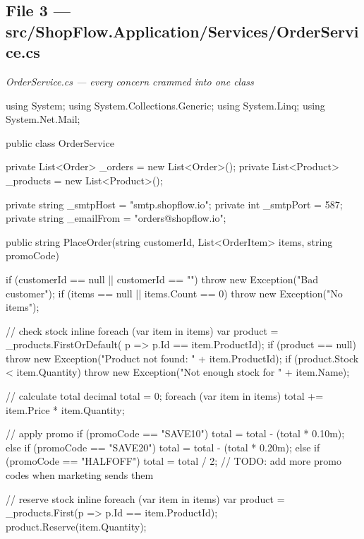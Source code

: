 \documentclass[11pt,a4paper]{article}
\newcommand{\codelabel}[1]{%
  \vspace{2pt}%
  {\footnotesize\color{gray}\textit{#1}}%
  \vspace{2pt}%
}
\begin{document}
\subsection{File 3 --- src/ShopFlow.Application/Services/OrderService.cs}

\codelabel{OrderService.cs --- every concern crammed into one class}
\begin{codeframe}
\begin{codeblock}
using System;
using System.Collections.Generic;
using System.Linq;
using System.Net.Mail;

public class OrderService
{
    private List<Order>   _orders   = new List<Order>();
    private List<Product> _products = new List<Product>();

    private string _smtpHost  = "smtp.shopflow.io";
    private int    _smtpPort  = 587;
    private string _emailFrom = "orders@shopflow.io";

    public string PlaceOrder(string customerId,
                             List<OrderItem> items,
                             string promoCode)
    {
        if (customerId == null || customerId == "")
            throw new Exception("Bad customer");
        if (items == null || items.Count == 0)
            throw new Exception("No items");

        // check stock inline
        foreach (var item in items)
        {
            var product = _products.FirstOrDefault(
                p => p.Id == item.ProductId);
            if (product == null)
                throw new Exception("Product not found: " + item.ProductId);
            if (product.Stock < item.Quantity)
                throw new Exception("Not enough stock for " + item.Name);
        }

        // calculate total
        decimal total = 0;
        foreach (var item in items)
            total += item.Price * item.Quantity;

        // apply promo
        if (promoCode == "SAVE10")
            total = total - (total * 0.10m);
        else if (promoCode == "SAVE20")
            total = total - (total * 0.20m);
        else if (promoCode == "HALFOFF")
            total = total / 2;
        // TODO: add more promo codes when marketing sends them

        // reserve stock inline
        foreach (var item in items)
        {
            var product = _products.First(p => p.Id == item.ProductId);
            product.Reserve(item.Quantity);
        }

}}
\end{codeblock}
\end{codeframe}
\end{document}

